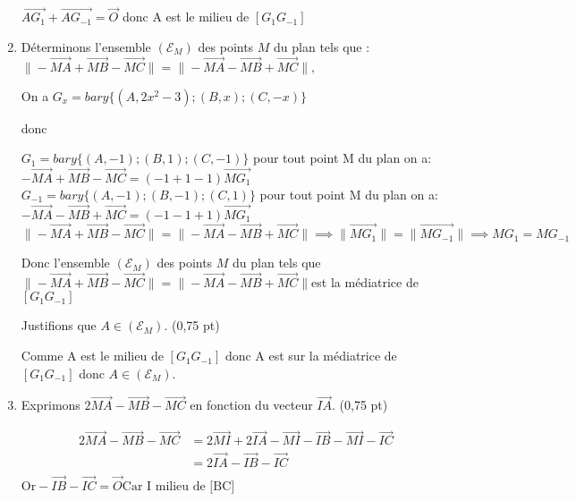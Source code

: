 \documentclass[12pt,a4paper]{article}
\begin{document}
\begin{enumerate}
$\overrightarrow{AG_1} + \overrightarrow{AG_{-1}}= \overrightarrow{O}$ donc A est le milieu de $[G_1G_{-1}]$
 \item Déterminons l’ensemble $(\mathscr{E}_M)$ des points $M$ du plan tels que :\\
    \(
    \|-\overrightarrow{MA} + \overrightarrow{MB} - \overrightarrow{MC}\| = \|-\overrightarrow{MA} - \overrightarrow{MB} + \overrightarrow{MC}\|,
    \)
    
On a $G_x=bary\{(A, 2x^2 - 3); (B, x); (C, -x)\}$ 

donc 

$G_1=bary\{(A, -1); (B, 1); (C, -1)\}$ pour tout point M du plan on a:\\

\(-\overrightarrow{MA} + \overrightarrow{MB} - \overrightarrow{MC} = (-1+1-1)\overrightarrow{MG_1} \)\\

$G_{-1}=bary\{(A, -1); (B, -1); (C, 1)\}$ pour tout point M du plan on a:\\

\( -\overrightarrow{MA} - \overrightarrow{MB} + \overrightarrow{MC} = (-1-1+1)\overrightarrow{MG_1} \)
\vspace{1cm}\\
\(
\|-\overrightarrow{MA} + \overrightarrow{MB} - \overrightarrow{MC}\| =  \|-\overrightarrow{MA} - \overrightarrow{MB} + \overrightarrow{MC}\| \implies \| \overrightarrow{MG_1} \| =\|\overrightarrow{MG_{-1}}\|\implies MG_1 =MG_{-1}
\)

Donc l’ensemble $(\mathscr{E}_M)$ des points $M$ du plan tels que \( \|-\overrightarrow{MA} + \overrightarrow{MB} - \overrightarrow{MC}\| = \|-\overrightarrow{MA} - \overrightarrow{MB} + \overrightarrow{MC}\|\)est la médiatrice de $[G_1G_{-1}]$

Justifions que $A \in (\mathscr{E}_M)$. \hfill (0,75 pt)

Comme A est le milieu de $[G_1G_{-1}]$ donc A est sur la médiatrice de $[G_1G_{-1}]$ donc  $A \in (\mathscr{E}_M)$.

    \item Exprimons $2\overrightarrow{MA} - \overrightarrow{MB} - \overrightarrow{MC}$ en fonction du vecteur $\overrightarrow{IA}$. \hfill (0,75 pt)

\begin{align*}
2\overrightarrow{MA} - \overrightarrow{MB} - \overrightarrow{MC} &= 2\overrightarrow{MI}+2\overrightarrow{IA} - \overrightarrow{MI}-\overrightarrow{IB} - \overrightarrow{MI}-\overrightarrow{IC}\\
&=2\overrightarrow{IA}-\overrightarrow{IB}-\overrightarrow{IC}\\
\end{align*}
$\text{Or} -\overrightarrow{IB}-\overrightarrow{IC}=\overrightarrow{O} \text{Car I milieu de [BC]}$


\end{enumerate}
\end{document}
